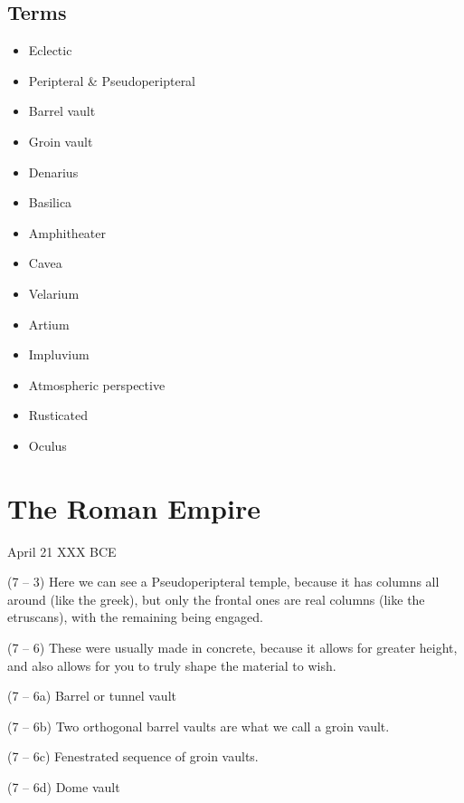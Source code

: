 \documentclass{article}
\begin{document}
    \begin{spacing}{1.2}
    \newpage
        \subsection{Terms}
        \begin{itemize}
            \item Eclectic
            \item Peripteral \& Pseudoperipteral
            \item Barrel vault
            \item Groin vault 
            \item Denarius
            \item Basilica
            \item Amphitheater 
            \item Cavea
            \item Velarium
            \item Artium
            \item Impluvium
            \item Atmospheric perspective
            \item Rusticated
            \item Oculus
        \end{itemize}
        
        \section{The Roman Empire}
        \begin{flushright}
            April 21 XXX BCE
        \end{flushright}

        (7 -- 3) Here we can see a Pseudoperipteral temple, because it has columns all around (like the greek), but only the frontal ones are real columns (like the etruscans), with the remaining being engaged.

        (7 -- 6) These were usually made in concrete, because it allows for greater height, and also allows for you to truly shape the material to wish.

        (7 -- 6a) Barrel or tunnel vault

        (7 -- 6b) Two orthogonal barrel vaults are what we call a groin vault. 

        (7 -- 6c) Fenestrated sequence of groin vaults. 

        (7 -- 6d) Dome vault 


\end{spacing}
\end{document}
